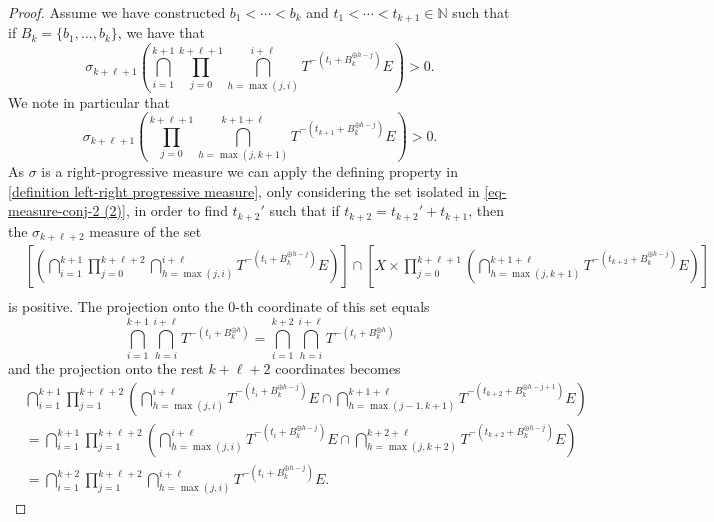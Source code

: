 \documentclass[letter, 11pt]{article}
\theoremstyle{definition}
\theoremstyle{plain}
\newcommand{\N}{\mathbb{N}}
\newcommand{\1}{\mathbbm{1}}
\begin{document}
\begin{proof}
    Assume we have constructed $b_1<\cdots<b_k$ and $t_1<\cdots< t_{k+1}\in \N$ such that if $B_k=\{b_1,\ldots,b_k\}$, we have that
    \begin{equation}\label{eq-measure-conj-2}
        \sigma_{k+\ell+1}\left(\bigcap_{i=1}^{k+1}  \prod_{j=0}^{k+\ell+1}\bigcap_{h=\max(j,i)}^{i+\ell}  T^{-\left( t_i+ B_k^{\oplus h-j} \right)}  E   \right)>0.
    \end{equation}
    We note in particular that 
    \begin{equation}\label{eq-measure-conj-2 (2)}
    \sigma_{k+\ell+1}\left( \prod_{j=0}^{k+\ell+1}\bigcap_{h=\max(j,k+1)}^{k+1+\ell}  T^{-\left( t_{k+1}+ B_k^{\oplus h-j} \right)}  E   \right)>0.    
    \end{equation}
    As $\sigma$ is a right-progressive measure we can apply the defining property in \cref{definition left-right progressive measure}, only considering the set isolated in \eqref{eq-measure-conj-2 (2)}, in order to find $t_{k+2}'$ such that if $t_{k+2}=t_{k+2}'+t_{k+1}$, then the $\sigma_{k+\ell+2}$ measure of the set 
    \begin{align*}
           &\left[\left(\bigcap_{i=1}^{k+1}  \prod_{j=0}^{k+\ell+2}\bigcap_{h=\max(j,i)}^{i+\ell}  T^{-\left( t_i+ B_k^{\oplus h-j} \right)}  E   \right)\right] \cap  \left[ X\times  \prod_{j=0}^{k+\ell+1}  \left(\bigcap_{h=\max(j,k+1)}^{k+1+\ell}  T^{-\left( t_{k+2}+ B_k^{\oplus h-j} \right)}  E \right) \right]\\
         \end{align*}
         is positive. The projection onto the $0$-th coordinate of this set equals 
         $$ \bigcap_{i=1}^{k+1} \bigcap_{h=i}^{i+\ell}  T^{-\left( t_i+ B_k^{\oplus h}\right)} =  \bigcap_{i=1}^{k+2} \bigcap_{h=i}^{i+\ell}  T^{-\left( t_i+ B_k^{\oplus h}\right)} $$ 
         and the projection onto the rest $k+\ell+2$ coordinates becomes 
         \begin{align*}
            & \bigcap_{i=1}^{k+1}  \prod_{j=1}^{k+\ell+2} \left(\bigcap_{h=\max(j,i)}^{i+\ell}  T^{-\left( t_i+ B_k^{\oplus h-j} \right)}  E  \cap \bigcap_{h=\max(j-1,k+1)}^{k+1+\ell} T^{-\left(t_{k+2}+ B_k^{\oplus h-j+1}\right)} E\right) \\
           &=  \bigcap_{i=1}^{k+1}  \prod_{j=1}^{k+\ell+2}\left(\bigcap_{h=\max(j,i)}^{i+\ell}  T^{-\left( t_i+ B_k^{\oplus h-j} \right)}  E  \cap \bigcap_{h=\max(j,k+2)}^{k+2+\ell} T^{-\left(t_{k+2}+ B_k^{\oplus h-j}\right)}E \right)\\
           &=\bigcap_{i=1}^{k+2}  \prod_{j=1}^{k+\ell+2}\bigcap_{h=\max(j,i)}^{i+\ell}  T^{-\left( t_i+ B_k^{\oplus h-j} \right)}  E. 

\end{align*}
\end{proof}
\end{document}
